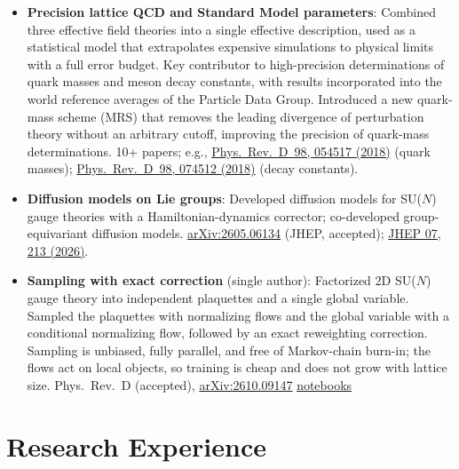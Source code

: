 \documentclass[11pt,a4paper,sans]{moderncv}
\begin{document}
\begin{itemize}[leftmargin=*]
\item \textbf{Precision lattice QCD and Standard Model parameters}: Combined three effective field theories into a single effective description, used as a statistical model that extrapolates expensive simulations to physical limits with a full error budget. Key contributor to high-precision determinations of quark masses and meson decay constants, with results incorporated into the world reference averages of the Particle Data Group. Introduced a new quark-mass scheme (MRS) that removes the leading divergence of perturbation theory without an arbitrary cutoff, improving the precision of quark-mass determinations. 10+ papers; e.g., \href{https://journals.aps.org/prd/abstract/10.1103/PhysRevD.98.054517}{Phys.~Rev.~D~98, 054517 (2018)} (quark masses); \href{https://journals.aps.org/prd/abstract/10.1103/PhysRevD.98.074512}{Phys.~Rev.~D~98, 074512 (2018)} (decay constants).

\item \textbf{Diffusion models on Lie groups}: Developed diffusion models for SU($N$) gauge theories with a Hamiltonian-dynamics corrector; co-developed group-equivariant diffusion models. \href{https://arxiv.org/abs/2605.06134}{arXiv:2605.06134} (JHEP, accepted); \href{https://link.springer.com/article/10.1007/JHEP07(2026)213}{JHEP 07, 213 (2026)}.

\item \textbf{Sampling with exact correction} (single author): Factorized 2D SU($N$) gauge theory into independent plaquettes and a single global variable. Sampled the plaquettes with normalizing flows and the global variable with a conditional normalizing flow, followed by an exact reweighting correction. Sampling is unbiased, fully parallel, and free of Markov-chain burn-in; the flows act on local objects, so training is cheap and does not grow with lattice size. Phys.\ Rev.\ D (accepted), \href{https://arxiv.org/abs/2610.09147}{arXiv:2610.09147} \textbar{} \href{https://github.com/jkomijani/holonomy-2d-gauge-notebooks}{notebooks}

\end{itemize}

\section{Research Experience}
\end{document}
